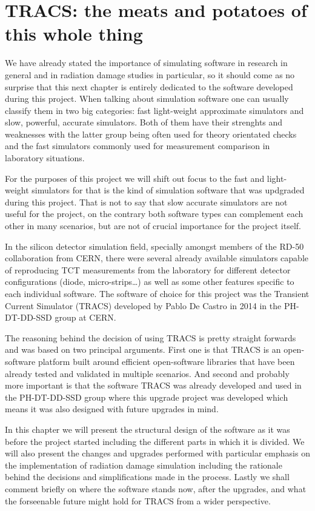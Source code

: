 \chapter{TRACS: the meats and potatoes of this whole thing}
\label{chap:Comp}

We have already stated the importance of simulating software in research in general and in radiation damage studies in particular, so it should come as no surprise that this next chapter is entirely dedicated to the software developed during this project. When talking about simulation software one can usually classify them in two big categories: fast light-weight approximate simulators and slow, powerful, accurate simulators. Both of them have their strenghts and weaknesses with the latter group being often used for theory orientated checks and the fast simulators commonly used for measurement comparison in laboratory situations.

For the purposes of this project we will shift out focus to the fast and light-weight simulators for that is the kind of simulation software that was updgraded during this project. That is not to say that slow accurate simulators are not useful for the project, on the contrary both software types can complement each other in many scenarios, but are not of crucial importance for the project itself.

In the silicon detector simulation field, specially amongst members of the RD-50 collaboration from CERN, there were several already available simulators capable of reproducing TCT measurements from the laboratory for different detector configurations (diode, micro-strips\ldots) as well as some other features specific to each individual software. The software of choice for this project was the Transient Current Simulator (TRACS) developed by Pablo De Castro in 2014 in the PH-DT-DD-SSD group at CERN. 

The reasoning behind the decision of using TRACS is pretty straight forwards and was based on two principal arguments. First one is that TRACS is an open-software platform built around efficient open-software libraries that have been already tested and validated in multiple scenarios. And second and probably more important is that the software TRACS was already developed and used in the PH-DT-DD-SSD group where this upgrade project was developed which means it was also designed with future upgrades in mind. 

In this chapter we will present the structural design of the software as it was before the project started including the different parts in which it is divided. We will also present the changes and upgrades performed with particular emphasis on the implementation of radiation damage simulation including the rationale behind the decisions and simplifications made in the process. Lastly we shall comment briefly on where the software stands now, after the upgrades, and what the forseenable future might hold for TRACS from a wider perspective.

